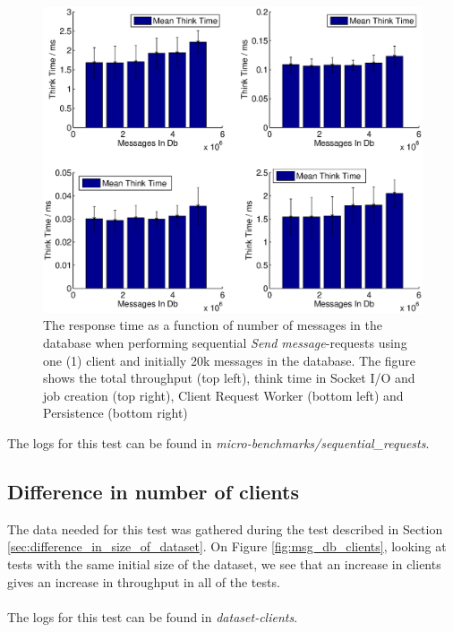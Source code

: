 \documentclass{article}
\begin{document}
            \begin{figure}[H]
                \centerline{\includegraphics[scale=0.55]{resptime_as_function_of_msgs_in_db_push}}
                \caption{The response time as a function of number of messages in the database when performing sequential \textit{Send message}-requests using one (1) client and initially 20k messages in the database. The figure shows the total throughput (top left), think time in Socket I/O and job creation (top right), Client Request Worker (bottom left) and Persistence (bottom right)}
                \label{fig:resptime_as_function_of_msgs_in_db_push}
            \end{figure}
        The logs for this test can be found in \textit{micro-benchmarks/sequential\_requests}.

        \subsection{Difference in number of clients}
            The data needed for this test was gathered during the test described in Section \ref{sec:difference_in_size_of_dataset}. On Figure \ref{fig:msg_db_clients}, looking at tests with the same initial size of the dataset, we see that an increase in clients gives an increase in throughput in all of the tests.\\
            \\
            The logs for this test can be found in \textit{dataset-clients}.
\end{document}
